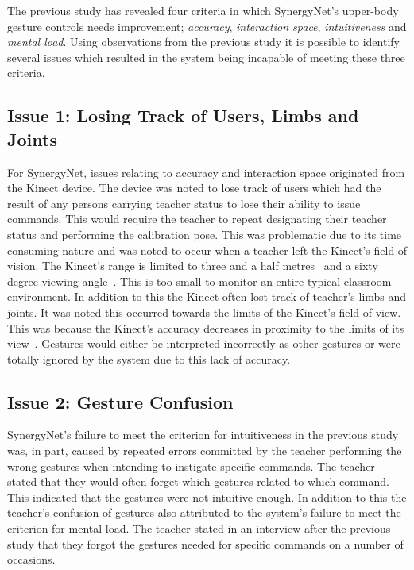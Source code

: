 \documentclass[manuscript, review, screen]{acmart}
\begin{document}
The previous study has revealed four criteria in which SynergyNet's upper-body gesture controls needs improvement; 
\textit{accuracy}, \textit{interaction space}, \textit{intuitiveness} and \textit{mental load}.
Using observations from the previous study it is possible to identify several issues which resulted in the system being incapable of meeting these three criteria.

\subsection*{Issue 1: Losing Track of Users, Limbs and Joints}

For SynergyNet, issues relating to accuracy and interaction space originated from the Kinect device.
The device was noted to lose track of users which had the result of any persons carrying teacher status to lose their ability to issue commands.
This would require the teacher to repeat designating their teacher status and performing the calibration pose.
This was problematic due to its time consuming nature and was noted to occur when a teacher left the Kinect's field of vision.
The Kinect's range is limited to three and a half metres~\cite{Maimone2011} and a sixty degree viewing angle~\cite{Stone2011}.
This is too small to monitor an entire typical classroom environment.
In addition to this the Kinect often lost track of teacher's limbs and joints.
It was noted this occurred towards the limits of the Kinect's field of view.
This was because the Kinect's accuracy decreases in proximity to the limits of its view~\cite{Mehrotra2011}.
Gestures would either be interpreted incorrectly as other gestures or were totally ignored by the system due to this lack of accuracy.

\subsection*{Issue 2: Gesture Confusion}

SynergyNet's failure to meet the criterion for intuitiveness in the previous study was, in part, caused by repeated errors committed by the teacher performing the wrong gestures when intending to instigate specific commands.
The teacher stated that they would often forget which gestures related to which command.
This indicated that the gestures were not intuitive enough.
In addition to this the teacher's confusion of gestures also attributed to the system's failure to meet the criterion for mental load.
The teacher stated in an interview after the previous study that they forgot the gestures needed for specific commands on a number of occasions.
\end{document}
